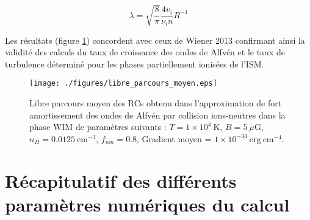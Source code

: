 \documentclass[10pt,a4paper]{article}
\begin{document}
\begin{equation}
	\lambda = \sqrt{\frac{8}{\pi}} \frac{4 v_i}{\nu_in} R^{-1}
\end{equation}

Les résultats (figure \ref{libre_parcours}) concordent avec ceux de Wiener 2013 confirmant ainsi la validité des calculs du taux de croissance des ondes de Alfvén et le taux de turbulence déterminé pour les phases partiellement ionisées de l'ISM. 
\begin{figure}
\centering
	\texttt{[image: ./figures/libre\_parcours\_moyen.eps]}
\label{libre_parcours}
\caption{Libre parcours moyen des RCs obtenu dans l'approximation de fort amortissement des ondes de Alfvén par collision ions-neutres dans la phase WIM de paramètres suivants : $T= 1\times 10^{4}~\mathrm{K}$, $B=5~\mu\mathrm{G}$, $n_H = 0.0125~\mathrm{cm}^{-3}$, $f_{ion} = 0.8$, Gradient moyen = $1\times 10^{-34}~\mathrm{erg}~\mathrm{cm}^{-4}$.}
\end{figure}













\appendix

\section{Récapitulatif des différents paramètres numériques du calcul}
\label{para_num}
\end{document}
